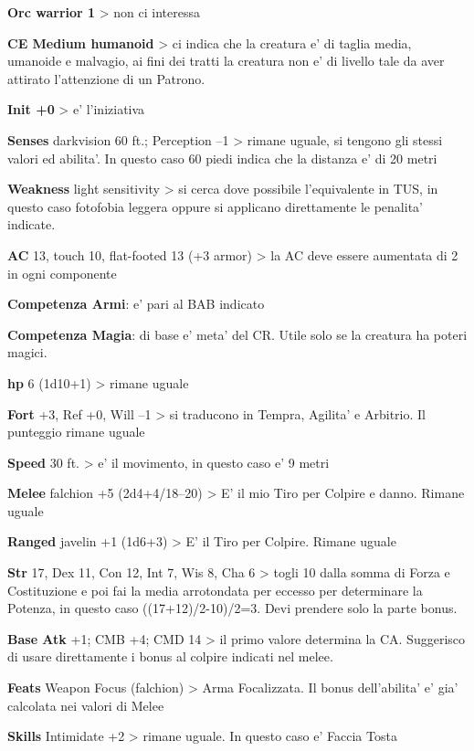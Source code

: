 \documentclass[a4paper,11pt,twoside,openany]{dndbook}
\begin{document}
{\textbf{Orc warrior 1} \textgreater{} non ci interessa

\textbf{CE Medium humanoid} \textgreater{} ci indica che la creatura e' di taglia media, umanoide e malvagio, ai fini dei tratti la creatura non e' di livello tale da aver attirato l'attenzione di un Patrono.

\textbf{Init +0} \textgreater{} e' l'iniziativa

\textbf{Senses} darkvision 60 ft.; Perception --1 \textgreater{} rimane uguale, si tengono gli stessi valori ed abilita'. In questo caso 60 piedi indica che la distanza e' di 20 metri

\textbf{Weakness} light sensitivity \textgreater{} si cerca dove possibile l'equivalente in TUS, in questo caso fotofobia leggera oppure si applicano direttamente le penalita' indicate.

\textbf{AC} 13, touch 10, flat-footed 13 (+3 armor) \textgreater{} la AC deve essere aumentata di 2 in ogni componente

\textbf{Competenza Armi}: e' pari al BAB indicato

\textbf{Competenza Magia}: di base e' meta' del CR. Utile solo se la creatura ha poteri magici.

\textbf{hp} 6 (1d10+1) \textgreater{} rimane uguale

\textbf{Fort} +3, Ref +0, Will --1 \textgreater{} si traducono in Tempra, Agilita' e Arbitrio. Il punteggio rimane uguale

\textbf{Speed} 30 ft. \textgreater{} e' il movimento, in questo
caso e' 9 metri

\textbf{Melee} falchion +5 (2d4+4/18--20) \textgreater{} E' il mio Tiro per Colpire e danno. Rimane uguale

\textbf{Ranged} javelin +1 (1d6+3) \textgreater{} E' il Tiro per Colpire. Rimane uguale

\textbf{Str} 17, Dex 11, Con 12, Int 7, Wis 8, Cha 6 \textgreater{} togli 10 dalla somma di Forza e Costituzione e poi fai la media arrotondata per eccesso per determinare la Potenza, in questo caso ((17+12)/2-10)/2=3. Devi prendere solo la parte bonus.

\textbf{Base Atk} +1; CMB +4; CMD 14 \textgreater{} il primo valore determina la CA. Suggerisco di usare direttamente i bonus al colpire indicati nel melee. 

\textbf{Feats} Weapon Focus (falchion) \textgreater{} Arma Focalizzata. Il bonus dell'abilita' e' gia' calcolata nei valori di Melee

\textbf{Skills} Intimidate +2 \textgreater{} rimane uguale. In questo caso e' Faccia Tosta

}
\end{document}
